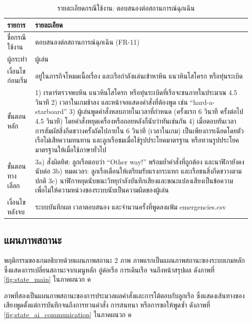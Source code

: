 \begin{table}[!htbp]
\centering
\caption{รายละเอียดกรณีใช้งาน: ตอบสนองต่อสถานการณ์ฉุกเฉิน}
\label{tab:uc_emergency}
\begin{tabular}{|L{3.50cm}|L{10.20cm}|}
\hline
\textbf{รายการ} & \textbf{รายละเอียด} \\
\hline
ชื่อกรณีใช้งาน & ตอบสนองต่อสถานการณ์ฉุกเฉิน (FR-11) \\ \hline
ผู้กระทำ & ผู้เล่น \\ \hline
เงื่อนไขก่อนเริ่ม & อยู่ในภารกิจโหมดเนื้อเรื่อง และเรือกำลังแล่นเข้าหาหิน แนวหินโสโครก หรือทุ่นระเบิด \\ \hline
ขั้นตอนหลัก & 1) เรดาร์ตรวจพบหิน แนวหินโสโครก หรือทุ่นระเบิดที่เรือจะชนภายในประมาณ 4.5 วินาที 2) เวลาในเกมช้าลง และหน้าจอแสดงคำสั่งที่ต้องพูด เช่น ``hard-a-starboard'' 3) ผู้เล่นพูดคำสั่งหลบภายในเวลาที่กำหนด (ครั้งแรก 6 วินาที ครั้งต่อไป 4.5 วินาที) โดยคำสั่งหยุดเครื่องหรือถอยหลังก็นับว่าทันเช่นกัน 4) เมื่อตอบทันเวลา การสัมผัสสิ่งกีดขวางครั้งถัดไปภายใน 6 วินาที (เวลาในเกม) เป็นเพียงการเฉียดโดยตัวเรือไม่เสียความทนทาน และลูกเรือชมเมื่อใช้รูปประโยคมาตรฐาน หรือทวนรูปประโยคมาตรฐานให้เมื่อใช้ภาษาทั่วไป \\ \hline
ขั้นตอนทางเลือก & 3a) สั่งผิดทิศ: ลูกเรือตอบว่า ``Other way!'' พร้อมย้ำคำสั่งที่ถูกต้อง และนาฬิกายังคงนับต่อ \newline 3b) หมดเวลา: ลูกเรือเตือนให้เตรียมรับแรงกระแทก และเรือชนสิ่งกีดขวางตามปกติ \newline 3c) นาฬิกาหยุดนับขณะวิทยุกำลังบันทึกเสียงและขณะแปลงเสียงเป็นข้อความ เพื่อไม่ให้ความหน่วงของระบบนับเป็นความผิดของผู้เล่น \\ \hline
เงื่อนไขหลังจบ & ระบบบันทึกผล เวลาตอบสนอง และจำนวนครั้งที่พูดลงแฟ้ม emergencies.csv \\
\hline
\end{tabular}
\end{table}

\subsection{แผนภาพสถานะ}

พฤติกรรมของเกมอธิบายด้วยแผนภาพสถานะ 2 ภาพ ภาพแรกเป็นแผนภาพสถานะของระบบเกมหลัก ซึ่งแสดงการเปลี่ยนสถานะจากเมนูหลัก อู่ต่อเรือ การเดินเรือ จนถึงหน้าสรุปผล ดังภาพที่ \ref{fig:state_main} ในภาคผนวก ค

ภาพที่สองเป็นแผนภาพสถานะของการประมวลผลคำสั่งและการโต้ตอบกับลูกเรือ ซึ่งแสดงเส้นทางของเสียงพูดตั้งแต่การบันทึกจนถึงการทวนคำสั่ง การสนทนา หรือการขอให้พูดซ้ำ ดังภาพที่ \ref{fig:state_ai_communication} ในภาคผนวก ค

